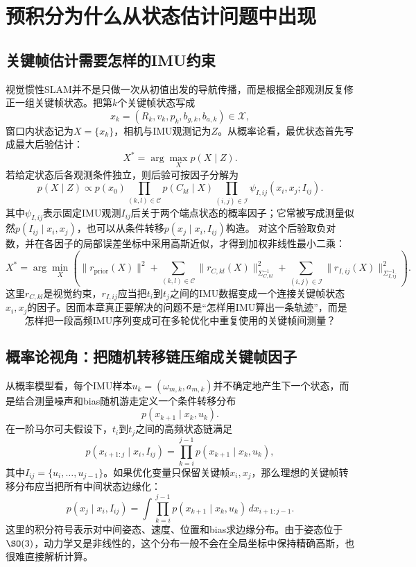 \section{预积分为什么从状态估计问题中出现}

\subsection{关键帧估计需要怎样的IMU约束}

视觉惯性SLAM并不是只做一次从初值出发的导航传播，而是根据全部观测反复修正一组关键帧状态。把第$k$个关键帧状态写成
\[
    x_k=(R_k,v_k,p_k,b_{g,k},b_{a,k})\in\mathcal X,
\]
窗口内状态记为$X=\{x_k\}$，相机与IMU观测记为$Z$。从概率论看，最优状态首先写成最大后验估计：
\[
    X^*=\arg\max_X p(X\mid Z).
\]
若给定状态后各观测条件独立，则后验可按因子分解为
\[
    p(X\mid Z)
    \propto
    p(x_0)
    \prod_{(k,l)\in\mathcal C}p(C_{kl}\mid X)
    \prod_{(i,j)\in\mathcal I}
      \psi_{I,ij}(x_i,x_j;I_{ij}).
\]
其中$\psi_{I,ij}$表示固定IMU观测$I_{ij}$后关于两个端点状态的概率因子；它常被写成测量似然$p(I_{ij}\mid x_i,x_j)$，也可以从条件转移$p(x_j\mid x_i,I_{ij})$构造。
对这个后验取负对数，并在各因子的局部误差坐标中采用高斯近似，才得到加权非线性最小二乘：
\[
\boxed{
    X^*
    =\arg\min_X
    \left(
      \|r_{\mathrm{prior}}(X)\|^2
      +\sum_{(k,l)\in\mathcal C}
       \|r_{C,kl}(X)\|_{\Sigma_{C,kl}^{-1}}^2
      +\sum_{(i,j)\in\mathcal I}
       \|r_{I,ij}(X)\|_{\Sigma_{I,ij}^{-1}}^2
    \right).
}
\]
这里$r_{C,kl}$是视觉约束，$r_{I,ij}$应当把$t_i$到$t_j$之间的IMU数据变成一个连接关键帧状态$x_i,x_j$的因子。因而本章真正要解决的问题不是“怎样用IMU算出一条轨迹”，而是
\[
\boxed{
    \text{怎样把一段高频IMU序列变成可在多轮优化中重复使用的关键帧间测量？}
}
\]

\subsection{概率论视角：把随机转移链压缩成关键帧因子}

从概率模型看，每个IMU样本$u_k=(\omega_{m,k},a_{m,k})$并不确定地产生下一个状态，而是结合测量噪声和bias随机游走定义一个条件转移分布
\[
    p(x_{k+1}\mid x_k,u_k).
\]
在一阶马尔可夫假设下，$t_i$到$t_j$之间的高频状态链满足
\[
    p(x_{i+1:j}\mid x_i,I_{ij})
    =\prod_{k=i}^{j-1}p(x_{k+1}\mid x_k,u_k),
\]
其中$I_{ij}=\{u_i,\ldots,u_{j-1}\}$。如果优化变量只保留关键帧$x_i,x_j$，那么理想的关键帧转移分布应当把所有中间状态边缘化：
\[
\boxed{
    p(x_j\mid x_i,I_{ij})
    =\int
      \prod_{k=i}^{j-1}p(x_{k+1}\mid x_k,u_k)
      \,d x_{i+1:j-1}.
}
\]
这里的积分符号表示对中间姿态、速度、位置和bias求边缘分布。由于姿态位于$\SO(3)$，动力学又是非线性的，这个分布一般不会在全局坐标中保持精确高斯，也很难直接解析计算。

